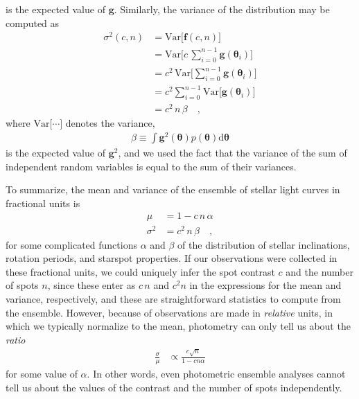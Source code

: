 \documentclass[modern]{aastex62}
\begin{document}
%
is the expected value of $\mathbf{g}$.
%
Similarly, the variance of the distribution may be computed as
%
\begin{align}
    \sigma^2(c, n) & = \mathrm{Var} \Big[ \mathbf{f}(c, n) \Big] \nonumber                         \nonumber \\
                   & = \mathrm{Var} \Big[ c \, \sum_{i=0}^{n-1} \mathbf{g}(\pmb{\theta}_i) \Big]   \nonumber \\
                   & = c^2 \, \mathrm{Var} \Big[ \sum_{i=0}^{n-1} \mathbf{g}(\pmb{\theta}_i) \Big] \nonumber \\
                   & = c^2 \sum_{i=0}^{n-1} \mathrm{Var} \Big[  \mathbf{g}(\pmb{\theta}_i) \Big]   \nonumber \\
                   & = c^2 \, n \, \beta
    \quad,
\end{align}
%
where $\mathrm{Var}\big[\cdots\big]$ denotes the variance,
%
\begin{align}
    \beta \equiv \int \mathbf{g}^2 (\pmb{\theta}) p(\pmb{\theta}) \mathrm{d} \pmb{\theta}
\end{align}
%
is the expected value of $\mathbf{g}^2$, and we used the fact that the variance
of the sum of independent random variables is equal to the sum of their variances.

%

To summarize, the mean and variance of the ensemble of stellar light curves
in fractional units is
%
\begin{align}
    \mu      & = 1 - c \, n \, \alpha
    \nonumber                         \\
    \sigma^2 & = c^2 \, n \, \beta
    \quad,
\end{align}
%
for some complicated functions $\alpha$ and $\beta$ of the distribution of
stellar inclinations,
rotation periods, and starspot properties.
%
If our observations were collected in these fractional units,
we could uniquely infer the spot contrast $c$ and the number of spots $n$,
since these enter as $c \, n$ and $c^2 n$ in the expressions for the mean
and variance, respectively, and these are straightforward statistics to
compute from the ensemble.
%
However, because of observations are made in \emph{relative} units, in which
we typically normalize to the mean, photometry can only tell us about the \emph{ratio}
%
\begin{align}
    \frac{\sigma}{\mu}
     & \propto \frac{c \sqrt{n}}{1 - c n \alpha}
\end{align}
%
for some value of $\alpha$.
In other words, even photometric ensemble analyses cannot tell
us about the values of the contrast and the number of spots independently.
\end{document}
